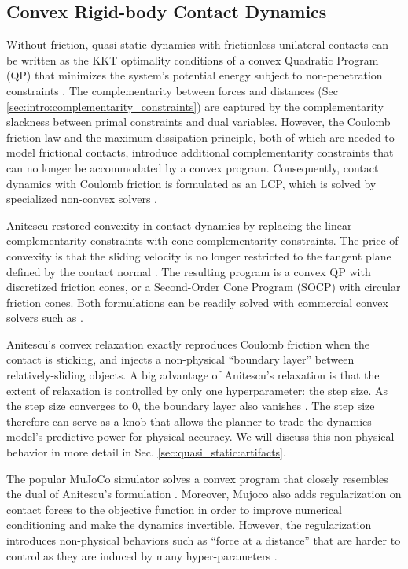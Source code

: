 \subsection{Convex Rigid-body Contact Dynamics} \label{sec:convex_contact_background}
Without friction, quasi-static dynamics with frictionless unilateral contacts can be written as the KKT optimality conditions of a convex Quadratic Program (QP) that minimizes the system's potential energy subject to non-penetration constraints \cite{pang2021convex}. The complementarity between forces and distances (Sec \ref{sec:intro:complementarity_constraints}) are captured by the complementarity slackness between primal constraints and dual variables. However, the Coulomb friction law and the maximum dissipation principle, both of which are needed to model frictional contacts, introduce additional complementarity constraints that can no longer be accommodated by a convex program. Consequently, contact dynamics with Coulomb friction is formulated as an LCP, which is solved by specialized non-convex solvers \cite{anitescu1997formulating, stewart2000rigid}.

Anitescu restored convexity in contact dynamics by replacing the linear complementarity constraints with cone complementarity constraints. The price of convexity is that the sliding velocity is no longer restricted to the tangent plane defined by the contact normal \cite{anitescu2006optimization, SiggraphContact22}. The resulting program is a convex QP with discretized friction cones, or a Second-Order Cone Program (SOCP) with circular friction cones. Both formulations can be readily solved with commercial convex solvers such as \cite{mosek}.

Anitescu's convex relaxation exactly reproduces Coulomb friction when the contact is sticking, and injects a non-physical ``boundary layer'' between relatively-sliding objects. A big advantage of Anitescu's relaxation is that the extent of relaxation is controlled by only one hyperparameter: the step size. As the step size converges to 0, the boundary layer also vanishes \cite{anitescu2006optimization}. The step size therefore can serve as a knob that allows the planner to trade the dynamics model's predictive power for physical accuracy. We will discuss this non-physical behavior in more detail in Sec. \ref{sec:quasi_static:artifacts}.

The popular MuJoCo simulator\cite{todorov2012mujoco, todorov2014convex} solves a convex program that closely resembles the dual of Anitescu's formulation \cite[Appendix B]{underactuated}. Moreover, Mujoco also adds regularization on contact forces to the objective function in order to improve numerical conditioning and make the dynamics invertible. However, the regularization introduces non-physical behaviors such as ``force at a distance'' that are harder to control as they are induced by many hyper-parameters \cite{kolbert2016experimental}. 


